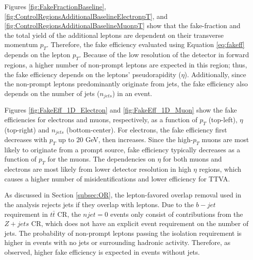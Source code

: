 Figures \ref{fig:FakeFractionBaseline}, \ref{fig:ControlRegionsAdditionalBaselineElectronpT}, and \ref{fig:ControlRegionsAdditionalBaselineMuonpT} show that the fake-fraction and the total yield of the additional leptons are dependent on their transverse momentum $p_{T}$. Therefore, the fake efficiency evaluated using Equation \ref{eq:fakeff} depends on the lepton $p_{T}$. Because of the low resolution of the detector in forward regions, a higher number of non-prompt leptons are expected in this region; thus, the fake efficiency depends on the leptons' pseudorapidity ($\eta$). Additionally, since the non-prompt leptons predominantly originate from jets, the fake efficiency also depends on the number of jets ($n_{jets}$) in an event. 

Figures \ref{fig:FakeEff_1D_Electron} and \ref{fig:FakeEff_1D_Muon} show the fake efficiencies for electrons and muons, respectively, as a function of $p_{T}$ (top-left), $\eta$ (top-right) and $n_{jets}$ (bottom-center). For electrons, the fake efficiency first decreases with $p_{T}$ up to $20$ GeV, then increases. Since the high-$p_{T}$ muons are most likely to originate from a prompt source, fake efficiency typically decreases as a function of $p_{T}$ for the muons. The dependencies on $\eta$ for both muons and electrons are most likely from lower detector resolution in high $\eta$ regions, which causes a higher number of misidentifications and lower efficiency for TTVA.

As discussed in Section \ref{subsec:OR}, the lepton-favored overlap removal used in the analysis rejects jets if they overlap with leptons. Due to the $b-jet$ requirement in $t\bar{t}$ CR, the $njet=0$ events only consist of contributions from the $Z+jets$ CR, which does not have an explicit event requirement on the number of jets. The probability of non-prompt leptons passing the isolation requirement is higher in events with no jets or surrounding hadronic activity. Therefore, as observed, higher fake efficiency is expected in events without jets.  

